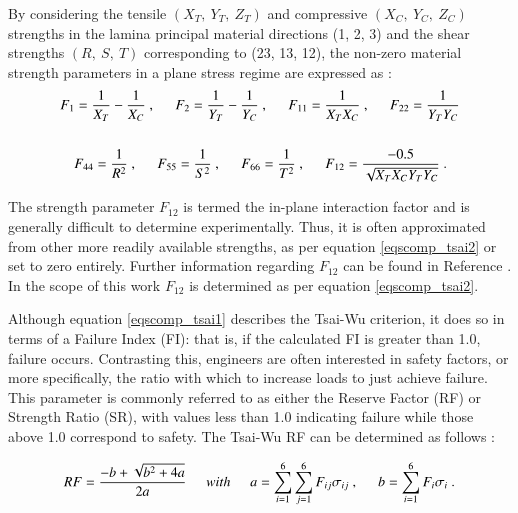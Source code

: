 By considering the tensile $(X_T,\ Y_T,\ Z_T)$ and compressive $(X_C,\ Y_C,\ Z_C)$ strengths in the lamina principal material directions (1, 2, 3) and the shear strengths $(R,\ S,\ T)$ corresponding to (23, 13, 12), the non-zero material strength parameters in a plane stress regime are expressed as \cite{reddy2004mechanics}:
\begin{gather} 
	\begin{aligned}
		&F_1 = \frac{1}{X_T} - \frac{1}{X_C}\ ,
		\hspace{5mm}
		F_2 = \frac{1}{Y_T} - \frac{1}{Y_C}\ ,
		\hspace{5mm}
		F_{11} = \frac{1}{X_TX_C}\ ,
		\hspace{5mm}
		F_{22} = \frac{1}{Y_TY_C}
		\\
		\\
		&\ \ \ \ 
		F_{44} = \frac{1}{R^2}\ ,
		\hspace{5mm}
		F_{55} = \frac{1}{S^2}\ ,
		\hspace{5mm}
		F_{66} = \frac{1}{T^2}\ ,
		\hspace{5mm}
		F_{12} = \frac{-0.5}{\sqrt{X_TX_CY_TY_C}}\ .
		\label{eqscomp_tsai2}
	\end{aligned}
\end{gather}

The strength parameter $F_{12}$ is termed the in-plane interaction factor and is generally difficult to determine experimentally. Thus, it is often approximated from other more readily available strengths, as per equation \ref{eqscomp_tsai2} or set to zero entirely. Further information regarding $F_{12}$ can be found in Reference \cite{tsai12}. In the scope of this work $F_{12}$ is determined as per equation \ref{eqscomp_tsai2}.

Although equation \ref{eqscomp_tsai1} describes the Tsai-Wu criterion, it does so in terms of a Failure Index (FI): that is, if the calculated FI is greater than 1.0, failure occurs. Contrasting this, engineers are often interested in safety factors, or more specifically, the ratio with which to increase loads to just achieve failure. This parameter is commonly referred to as either the Reserve Factor (RF) or Strength Ratio (SR), with values less than 1.0 indicating failure while those above 1.0 correspond to safety. The Tsai-Wu RF can be determined as follows \cite{kolios2012evaluation}:

\begin{equation} 
RF = \frac{-b + \sqrt{b^2 + 4a}}{2a}
\hspace{5mm}with\hspace{5mm}
a = \sum_{i=1}^{6} \sum_{j=1}^{6} F_{ij} \sigma_{ij}\ ,
\hspace{5mm}
b = \sum_{i=1}^{6} F_i \sigma_i 
\label{eqscomp_stress_recovery3}\ .
\end{equation}

